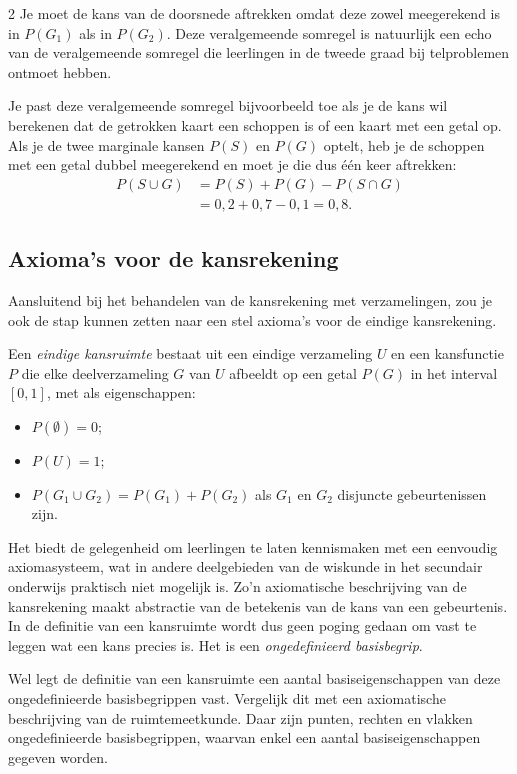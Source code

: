 \begin{multicols}{2}
Je moet de kans van de doorsnede aftrekken omdat deze zowel meegerekend is in $P(G_1)$ als in $P(G_2)$. Deze veralgemeende somregel is natuurlijk een echo van de veralgemeende somregel die leerlingen in de tweede graad bij telproblemen ontmoet hebben. 

Je past deze veralgemeende somregel bijvoorbeeld toe als je de kans wil berekenen dat de getrokken kaart een schoppen is of een kaart met een getal op. Als je de twee marginale kansen $P(S)$ en $P(G)$ optelt, heb je de schoppen met een getal dubbel meegerekend en moet je die dus één keer aftrekken:
\begin{equation*}
\begin{split}
P(S \cup G) &=P(S)+P(G)-P(S \cap G)\\
 & =0,2+0,7-0,1=0,8.
\end{split}
\end{equation*}

\subsection*{Axioma’s voor de kansrekening}
Aansluitend bij het behandelen van de kansrekening met verzamelingen, zou je ook de stap kunnen zetten naar een stel axioma’s voor de eindige kansrekening.

Een \emph{eindige kansruimte} bestaat uit een eindige verzameling $U$ en een kansfunctie $P$ die elke deelverzameling $G$ van $U$ afbeeldt op een getal $P(G)$ in het interval $[0,1]$, met als eigenschappen:
\begin{itemize}
    \item $P(\emptyset)=0$;
    \item $P(U)=1$;
    \item $P(G_1 \cup G_2)=P(G_1)+P(G_2)$ als $G_1$ en $G_2$ disjuncte gebeurtenissen zijn.
\end{itemize}
Het biedt de gelegenheid om leerlingen te laten kennismaken met een eenvoudig axiomasysteem, wat in andere deelgebieden van de wiskunde in het secundair onderwijs praktisch niet mogelijk is. Zo’n axiomatische beschrijving van de kansrekening maakt abstractie van de betekenis van de kans van een gebeurtenis. In de definitie van een kansruimte wordt dus geen poging gedaan om vast te leggen wat een kans precies is. Het is een \emph{ongedefinieerd basisbegrip}. 

Wel legt de definitie van een kansruimte een aantal basiseigenschappen van deze ongedefinieerde basisbegrippen vast. Vergelijk dit met een axiomatische beschrijving van de ruimtemeetkunde. Daar zijn punten, rechten en vlakken ongedefinieerde basisbegrippen, waarvan enkel een aantal basiseigenschappen gegeven worden.


\end{multicols}
